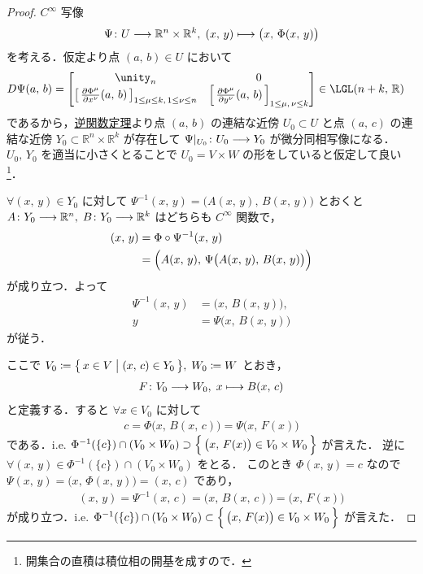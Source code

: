 \documentclass[TQFT_main]{subfiles}
\begin{document}
\begin{proof}
    $C^\infty$ 写像
    \begin{align}
        \Psi \colon U \longrightarrow \mathbb{R}^n \times \mathbb{R}^k,\; (x,\, y) \longmapsto \bigl( x,\, \Phi(x,\, y) \bigr) 
    \end{align}
    を考える．仮定より点 $(a,\, b) \in U$ において
    \begin{align}
        D\Psi (a,\, b) 
        &= \mqty[\unity_n & 0 \\ \left[\, \pdv{\Phi^\mu}{x^\nu}()(a,\, b) \,\right]_{1 \le \mu \le k,\, 1 \le \nu \le n} & \left[\, \pdv{\Phi^\mu}{y^\nu}()(a,\, b) \,\right]_{1 \le \mu,\, \nu \le k} ] \in \LGL(n+k,\, \mathbb{R})
    \end{align}
    であるから，\hyperref[thm:inverse-function-Rn]{逆関数定理}より点 $(a,\, b)$ の連結な近傍 $U_0 \subset U$ と点 $(a,\, c)$ の連結な近傍 $Y_0 \subset \mathbb{R}^n \times \mathbb{R}^k$ が存在して $\Psi|_{U_0} \colon U_0 \longrightarrow Y_0$ が微分同相写像になる．$U_0,\, Y_0$ を適当に小さくとることで $U_0 = V \times W$ の形をしていると仮定して良い\footnote{開集合の直積は積位相の開基を成すので．}．

    $\forall (x,\, y) \in Y_0$ に対して $\Psi^{-1}(x,\, y) = \bigl( A(x,\, y),\, B(x,\, y) \bigr)$ とおくと $A\colon Y_0 \longrightarrow \mathbb{R}^n,\; B \colon Y_0 \longrightarrow \mathbb{R}^k$ はどちらも $C^\infty$ 関数で，
    \begin{align}
        (x,\, y)
        &= \Phi \circ \Psi^{-1}(x,\, y) \\
        &= \Bigl( A(x,\, y),\, \Psi \bigl( A(x,\, y),\, B(x,\, y) \bigr)  \Bigr) 
    \end{align}
    が成り立つ．よって
    \begin{align}
        \Psi^{-1}(x,\, y) &= \bigl( x,\, B(x,\, y) \bigr), \\
        y &= \Psi \bigl( x,\, B(x,\, y) \bigr) 
    \end{align}
    が従う．

    ここで $V_0 \coloneqq \bigl\{\, x \in V \bigm| (x,\, c) \in Y_0 \,\bigr\},\; W_0 \coloneqq W$ とおき，
    \begin{align}
        F \colon V_0 \longrightarrow W_0,\; x \longmapsto B(x,\, c)
    \end{align}
    と定義する．すると $\forall x \in V_0$ に対して
    \begin{align}
        c = \Phi \bigl( x,\, B(x,\, c) \bigr) = \Psi \bigl( x,\, F(x) \bigr) 
    \end{align}
    である．i.e. $\Phi^{-1}(\{c\}) \cap (V_0 \times W_0) \supset \Bigl\{\, \bigl( x,\, F(x) \bigr) \in V_0 \times W_0 \,\Bigr\}$ が言えた．
    逆に $\forall (x,\, y) \in \Phi^{-1}(\{c\}) \cap (V_0 \times W_0)$ をとる．
    このとき $\Phi(x,\, y) = c$ なので $\Psi(x,\, y) = \bigl( x,\, \Phi(x,\, y) \bigr) = (x,\, c)$ であり，
    \begin{align}
        (x,\, y) = \Psi^{-1}(x,\, c) = \bigl( x,\, B(x,\, c) \bigr) = \bigl( x,\, F(x) \bigr) 
    \end{align}
    が成り立つ．i.e. $\Phi^{-1}(\{c\}) \cap (V_0 \times W_0) \subset \Bigl\{\, \bigl( x,\, F(x) \bigr) \in V_0 \times W_0 \,\Bigr\}$ が言えた．

\end{proof}
\end{document}
